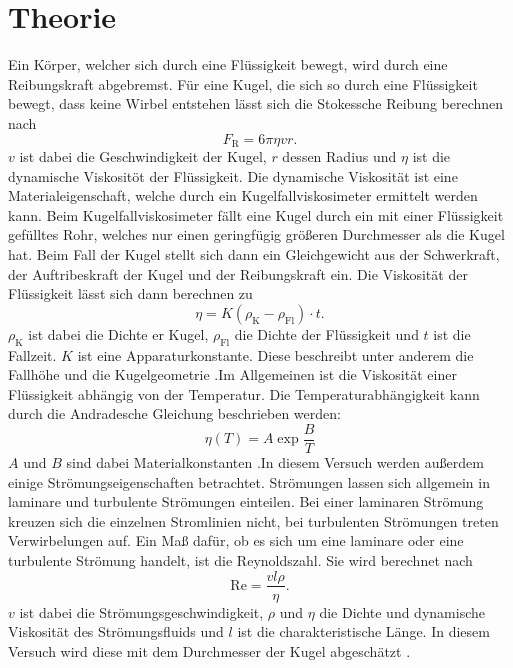 \section{Theorie}
Ein Körper, welcher sich durch eine Flüssigkeit bewegt, wird durch eine Reibungskraft abgebremst. Für eine Kugel, die sich so durch eine Flüssigkeit bewegt, dass keine Wirbel 
entstehen lässt sich die Stokessche Reibung berechnen nach
\begin{equation}
    F_\text{R} = 6 \pi \eta v r .
\end{equation}
$v$ ist dabei die Geschwindigkeit der Kugel, $r$ dessen Radius und $\eta$ ist die dynamische Viskositöt der Flüssigkeit. Die dynamische Viskosität ist eine Materialeigenschaft, 
welche durch ein Kugelfallviskosimeter ermittelt werden kann. Beim Kugelfallviskosimeter fällt eine Kugel durch ein mit einer Flüssigkeit gefülltes Rohr, welches nur einen 
geringfügig größeren Durchmesser als die Kugel hat. Beim Fall der Kugel stellt sich dann ein Gleichgewicht aus der Schwerkraft, der Auftribeskraft der Kugel und der Reibungskraft 
ein. Die Viskosität der Flüssigkeit lässt sich dann berechnen zu
\begin{equation}
    \label{eq:viskositaet}
    \eta = K (\rho_\text{K} - \rho_\text{Fl}) \cdot t .
\end{equation}
$\rho_\text{K}$ ist dabei die Dichte er Kugel, $\rho_\text{Fl}$ die Dichte der Flüssigkeit und $t$ ist die Fallzeit. $K$ ist eine Apparaturkonstante. Diese beschreibt unter anderem 
die Fallhöhe und die Kugelgeometrie \cite{V207}.Im Allgemeinen ist die Viskosität einer Flüssigkeit abhängig von der Temperatur. Die Temperaturabhängigkeit kann durch die Andradesche Gleichung beschrieben werden:
\begin{equation}
    \label{eq:andradescheGl}
    \eta (T) = A \exp{\frac{B}{T}}
\end{equation}
$A$ und $B$ sind dabei Materialkonstanten \cite{V207}.In diesem Versuch werden außerdem einige Strömungseigenschaften betrachtet. Strömungen lassen sich allgemein in laminare und turbulente Strömungen einteilen. Bei einer 
laminaren Strömung kreuzen sich die einzelnen Stromlinien nicht, bei turbulenten Strömungen treten Verwirbelungen auf. Ein Maß dafür, ob es sich um eine laminare oder eine 
turbulente Strömung handelt, ist die Reynoldszahl. Sie wird berechnet nach
\begin{equation}
    \label{eq:reynold}
    \text{Re} = \frac{v l \rho}{\eta}.
\end{equation}
$v$ ist dabei die Strömungsgeschwindigkeit, $\rho$ und $\eta$ die Dichte und dynamische Viskosität des Strömungsfluids und $l$ ist die charakteristische Länge. In diesem Versuch
 wird diese mit dem Durchmesser der Kugel abgeschätzt \cite{viskositaet}.